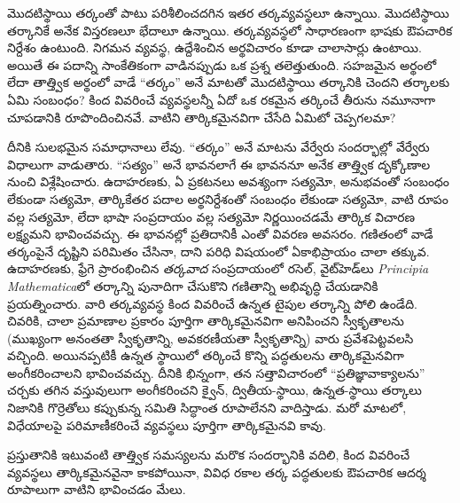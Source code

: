 \documentclass[../../../include/open-logic-section]{subfiles}
\begin{document}


మొదటిస్థాయి తర్కంతో పాటు పరిశీలించదగిన ఇతర తర్కవ్యవస్థలూ ఉన్నాయి.
మొదటిస్థాయి తర్కానికే అనేక విస్తరణలూ భేదాలూ ఉన్నాయి. తర్కవ్యవస్థలో సాధారణంగా భాషకు ఔపచారిక నిర్దేశం ఉంటుంది.
నిగమన వ్యవస్థ, ఉద్దేశించిన అర్థవిచారం కూడా చాలాసార్లు ఉంటాయి. అయితే ఈ పదాన్ని సాంకేతికంగా
వాడినప్పుడు ఒక ప్రశ్న తలెత్తుతుంది. సహజమైన అర్థంలో లేదా
తాత్త్విక అర్థంలో వాడే ``తర్కం'' అనే మాటతో మొదటిస్థాయి తర్కానికి చెందని
తర్కాలకు ఏమి సంబంధం? కింద వివరించే వ్యవస్థలన్నీ ఏదో ఒక రకమైన
తర్కించే తీరును నమూనాగా చూపడానికి రూపొందించినవే. వాటిని తార్కికమైనవిగా
చేసేది ఏమిటో చెప్పగలమా?

దీనికి సులభమైన సమాధానాలు లేవు. ``తర్కం'' అనే మాటను వేర్వేరు
సందర్భాల్లో వేర్వేరు విధాలుగా వాడుతారు. ``సత్యం'' అనే భావనలాగే ఈ
భావననూ అనేక తాత్త్విక దృక్కోణాల నుంచి విశ్లేషించారు. ఉదాహరణకు, ఏ
ప్రకటనలు అవశ్యంగా సత్యమో, అనుభవంతో సంబంధం లేకుండా సత్యమో, తార్కికేతర పదాల
అర్థనిర్దేశంతో సంబంధం లేకుండా సత్యమో, వాటి రూపం వల్ల సత్యమో, లేదా
భాషా సంప్రదాయం వల్ల సత్యమో నిర్ణయించడమే తార్కిక విచారణ లక్ష్యమని
భావించవచ్చు. ఈ భావనల్లో ప్రతిదానికీ ఎంతో వివరణ అవసరం. గణితంలో వాడే
తర్కంపైనే దృష్టిని పరిమితం చేసినా, దాని పరిధి విషయంలో ఏకాభిప్రాయం
చాలా తక్కువ. ఉదాహరణకు, ఫ్రేగె ప్రారంభించిన {\em తర్కవాద} సంప్రదాయంలో
రసెల్, వైట్‌హెడ్‌లు \textit{Principia Mathematica}లో తర్కాన్ని
పునాదిగా చేసుకొని గణితాన్ని అభివృద్ధి చేయడానికి ప్రయత్నించారు. వారి
తర్కవ్యవస్థ కింద వివరించే ఉన్నత టైపుల తర్కాన్ని పోలి ఉండేది.
చివరికి, చాలా ప్రమాణాల ప్రకారం పూర్తిగా తార్కికమైనవిగా అనిపించని
స్వీకృతాలను (ముఖ్యంగా అనంతతా స్వీకృతాన్ని, అవకరణీయతా స్వీకృతాన్ని)
వారు ప్రవేశపెట్టవలసి వచ్చింది. అయినప్పటికీ ఉన్నత స్థాయిలో తర్కించే
కొన్ని పద్ధతులను తార్కికమైనవిగా అంగీకరించాలని భావించవచ్చు. దీనికి
భిన్నంగా, తన సత్తావిచారంలో ``ప్రతిజ్ఞావాక్యాలను'' చర్చకు తగిన
వస్తువులుగా అంగీకరించని క్వైన్, ద్వితీయ-స్థాయి, ఉన్నత-స్థాయి తర్కాలు
నిజానికి గొర్రెతోలు కప్పుకున్న సమితి సిద్ధాంత రూపాలేనని వాదిస్తాడు.
మరో మాటలో, విధేయాలపై పరిమాణీకరించే వ్యవస్థలు పూర్తిగా తార్కికమైనవి
కావు.

ప్రస్తుతానికి ఇటువంటి తాత్త్విక సమస్యలను మరొక సందర్భానికి వదిలి,
కింద వివరించే వ్యవస్థలు తార్కికమైనవైనా కాకపోయినా, వివిధ రకాల తర్క పద్ధతులకు
ఔపచారిక ఆదర్శ రూపాలుగా వాటిని భావించడం మేలు.
\end{document}
